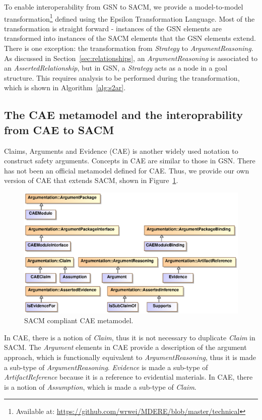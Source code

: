 To enable interoperability from GSN to SACM, we provide a model-to-model transformation\footnote{Available at: \url{https://github.com/wrwei/MDERE/blob/master/technical}} defined using the Epsilon Transformation Language\cite{kolovos2008epsilon}. 
Most of the transformation is straight forward - instances of the GSN elements are transformed into instances of the SACM elements that the GSN elements extend. 
There is one exception: the transformation from \textit{Strategy} to \textit{ArgumentReasoning}. As discussed in Section~\ref{sec:relationships}, an \textit{ArgumentReasoning} is associated to an \textit{AssertedRelationship}, but in GSN, a \textit{Strategy} acts as a node in a goal structure. 
This requires analysis to be performed during the transformation, which is shown in Algorithm~\ref{alg:s2ar}.

\subsection{The CAE metamodel and the interoprability from CAE to SACM}
Claims, Arguments and Evidence (CAE) \cite{cae} is another widely used notation to construct safety arguments. Concepts in CAE are similar to those in GSN. 
There has not been an official metamodel defined for CAE. Thus, we provide our own version of CAE that extends SACM, shown in Figure~\ref{fig:caeMetamodel}.

\begin{figure}
	\centering
	\includegraphics[width=1\linewidth]{CAE.eps}
	\caption{SACM compliant CAE metamodel.}
	\label{fig:caeMetamodel}
\end{figure}

In CAE, there is a notion of \textit{Claim}, thus it is not necessary to duplicate \textit{Claim} in SACM. 
The \textit{Argument} elements in CAE provide a description of the argument approach, which is functionally equivalent to \textit{ArgumentReasoning}, thus it is made a sub-type of \textit{ArgumentReasoning}.
\textit{Evidence} is made a sub-type of \textit{ArtifactReference} because it is a reference to evidential materials. 
In CAE, there is a notion of \textit{Assumption}, which is made a sub-type of \textit{Claim}. 

